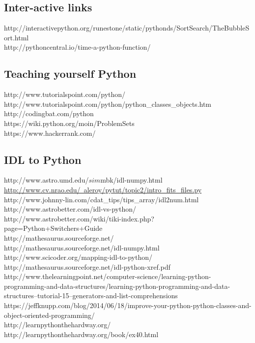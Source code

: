 \documentclass[11pt,a4paper]{article}
\begin{document}
\subsection*{Inter-active links}
http://interactivepython.org/runestone/static/pythonds/SortSearch/TheBubbleSort.html\\
http://pythoncentral.io/time-a-python-function/\\


\subsection*{Teaching yourself Python}
http://www.tutorialspoint.com/python/\\
http://www.tutorialspoint.com/python/python\_classes\_objects.htm\\
http://codingbat.com/python\\
https://wiki.python.org/moin/ProblemSets\\
https://www.hackerrank.com/\\


\subsection*{IDL to Python}
http://www.astro.umd.edu/$sim$mbk/idl-numpy.html\\
\href{http://www.cv.nrao.edu/~aleroy/pytut/topic2/intro\_fits\_files.py}{http://www.cv.nrao.edu/~aleroy/pytut/topic2/intro\_fits\_files.py}
http://www.johnny-lin.com/cdat\_tips/tips\_array/idl2num.html\\
http://www.astrobetter.com/idl-vs-python/ \\
http://www.astrobetter.com/wiki/tiki-index.php?page=Python+Switchers+Guide \\
http://mathesaurus.sourceforge.net/\\
http://mathesaurus.sourceforge.net/idl-numpy.html\\
http://www.scicoder.org/mapping-idl-to-python/\\
http://mathesaurus.sourceforge.net/idl-python-xref.pdf\\

\noindent
http://www.thelearningpoint.net/computer-science/learning-python-programming-and-data-structures/learning-python-programming-and-data-structures--tutorial-15--generators-and-list-comprehensions\\
https://jeffknupp.com/blog/2014/06/18/improve-your-python-python-classes-and-object-oriented-programming/\\
http://learnpythonthehardway.org/\\
http://learnpythonthehardway.org/book/ex40.html\\
\end{document}
